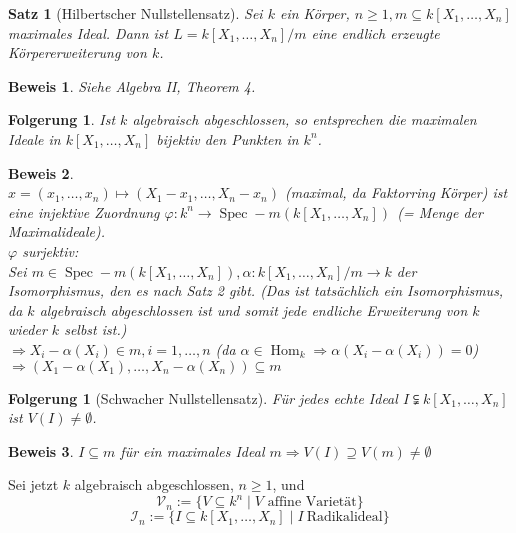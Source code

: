 \documentclass[a4paper,12pt]{report}
\theoremstyle{break}
\newtheorem{Satz}{Satz}
\newtheorem{Folg}[Def]{Folgerung}
\theoremstyle{nonumberbreak}
\theoremstyle{nonumberplain}
\newtheorem{Bew}{Beweis}
\begin{document}
\begin{Satz}[Hilbertscher Nullstellensatz]
Sei  $k$ ein Körper, $n\geq 1, m\subseteq k[X_1,\dots,X_n]$ maximales Ideal. Dann ist $L=k[X_1,\dots,X_n]/m$ eine endlich erzeugte Körpererweiterung von $k$.
\end{Satz}
\begin{Bew} Siehe Algebra II, Theorem 4. \end{Bew}
\begin{Folg}
Ist $k$ algebraisch abgeschlossen, so entsprechen die maximalen Ideale in $k[X_1,\dots,X_n]$ bijektiv den Punkten in $k^n$.
\end{Folg}
\begin{Bew}~\\
$x=(x_1,\dots,x_n)\mapsto (X_1-x_1,\dots,X_n-x_n)$ (maximal, da Faktorring Körper) ist eine injektive Zuordnung $\varphi: k^n \rightarrow\operatorname{Spec}-m(k[X_1,\dots,X_n])~~$(= Menge der Maximalideale).\\
$\varphi$ surjektiv:\\
Sei $m\in\operatorname{Spec}-m (k[X_1,\dots,X_n]), \alpha: k[X_1,\dots,X_n]/m \rightarrow k$ der Isomorphismus, den es nach Satz 2 gibt. (Das ist tatsächlich ein Isomorphismus, da $k$ algebraisch abgeschlossen ist und somit jede endliche Erweiterung von $k$ wieder $k$ selbst ist.)\\
$\Rightarrow X_i - \alpha(X_i)\in m, i= 1,\dots,n$ (da $\alpha\in \operatorname{Hom}_k\Rightarrow \alpha(X_i-\alpha(X_i))=0$)\\
$\Rightarrow (X_1-\alpha(X_1),\dots,X_n-\alpha(X_n)) \subseteq m$
\end{Bew}
\begin{Folg}[Schwacher Nullstellensatz]
Für jedes echte Ideal $I\subsetneqq k[X_1,\dots,X_n]$ ist $V(I)\neq \emptyset$.
\end{Folg}
\begin{Bew}
$I\subseteq m$ für ein maximales Ideal $m \Rightarrow V(I) \supseteq V(m) \neq \emptyset$
\end{Bew}
Sei jetzt  $k$ algebraisch abgeschlossen, $n\geq 1$, und
$$\mathcal{V}_n:= \{V\subseteq k^n\mid V \textrm{~affine~Varietät}\}$$
$$\mathcal{I}_n:=\{I\subseteq k[X_1,\dots,X_n]\mid I ~ \textrm{Radikalideal}\}$$
\end{document}
